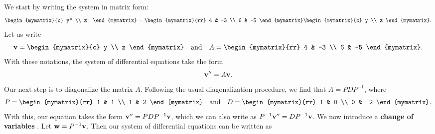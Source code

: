 \begin{solution}
  We start by writing the system in matrix form:
  \begin{equation*}
    \begin{mymatrix}{c} y'' \\ z'' \end{mymatrix}
    =
    \begin{mymatrix}{rr} 4 & -3 \\ 6 & -5 \end{mymatrix}
    \begin{mymatrix}{c} y \\ z \end{mymatrix}.
  \end{equation*}
  Let us write
  \begin{equation*}
    \vect{v} = \begin{mymatrix}{c} y \\ z \end{mymatrix}
    \quad\mbox{and}\quad
    A = \begin{mymatrix}{rr} 4 & -3 \\ 6 & -5 \end{mymatrix}.
  \end{equation*}
  With these notations, the system of differential equations take the
  form
  \begin{equation}\label{eqn:system-differential2-1}
    \vect{v}'' = A\vect{v}.
  \end{equation}
  Our next step is to diagonalize the matrix $A$. Following the usual
  diagonalization procedure, we find that $A=PDP^{-1}$, where
  \begin{equation*}
    P = \begin{mymatrix}{rr} 1 & 1 \\ 1 & 2 \end{mymatrix}
    \quad\mbox{and}\quad
    D = \begin{mymatrix}{rr} 1 & 0 \\ 0 & -2 \end{mymatrix}.
  \end{equation*}
  With this, our equation takes the form
  $\vect{v}'' = PDP^{-1}\vect{v}$, which we can also write as
  $P^{-1}\vect{v}'' = DP^{-1}\vect{v}$. We now introduce a
  \textbf{change of variables}%
  . Let
  $\vect{w} = P^{-1}\vect{v}$. Then our system of differential
  equations can be written as
  \begin{equation}\label{eqn:system-differential2-2}

\end{equation}
\end{solution}
